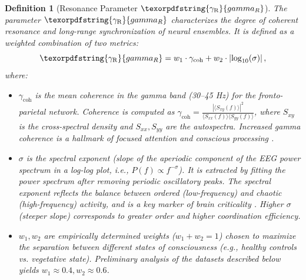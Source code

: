 \documentclass[12pt,a4paper]{article}
\newtheorem{definition}{Definition}
\DeclareRobustCommand{\gaR}{\texorpdfstring{\ensuremath{\gamma_{\mathrm{R}}}}{gamma_R}}
\begin{document}
	\begin{definition}[Resonance Parameter \(\gaR\)]
		The parameter \(\gaR\) characterizes the degree of coherent resonance and long-range synchronization of neural ensembles. It is defined as a weighted combination of two metrics:
		\begin{equation}
			\gaR = w_1 \cdot \gamma_{\text{coh}} + w_2 \cdot \left|\log_{10}(\sigma)\right|,
			\label{eq:gammaR_math}
		\end{equation}
		where:
		\begin{itemize}
			\item \(\gamma_{\text{coh}}\) is the mean coherence in the gamma band (30–45 Hz) for the fronto-parietal network. Coherence is computed as \( \gamma_{\text{coh}} = \frac{|\langle S_{xy}(f) \rangle|^2}{\langle S_{xx}(f) \rangle \langle S_{yy}(f) \rangle} \), where \(S_{xy}\) is the cross-spectral density and \(S_{xx}, S_{yy}\) are the autospectra. Increased gamma coherence is a hallmark of focused attention and conscious processing \cite{Lutz2017, Garcia2021}.
			\item \(\sigma\) is the spectral exponent (slope of the aperiodic component of the EEG power spectrum in a log-log plot, i.e., \(P(f) \propto f^{-\sigma}\)). It is extracted by fitting the power spectrum after removing periodic oscillatory peaks. The spectral exponent reflects the balance between ordered (low-frequency) and chaotic (high-frequency) activity, and is a key marker of brain criticality \cite{Beggs2003, Chialvo2010}. Higher \(\sigma\) (steeper slope) corresponds to greater order and higher coordination efficiency.
			\item \(w_1, w_2\) are empirically determined weights (\(w_1 + w_2 = 1\)) chosen to maximize the separation between different states of consciousness (e.g., healthy controls vs. vegetative state). Preliminary analysis of the datasets described below yields \(w_1 \approx 0.4, w_2 \approx 0.6\).
		\end{itemize}
	\end{definition}
	
\end{document}
